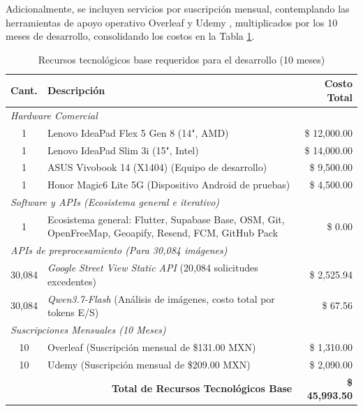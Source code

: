 Adicionalmente, se incluyen servicios por suscripción mensual, contemplando las herramientas de apoyo operativo Overleaf \cite{overleaf_pricing} y Udemy \cite{udemy_pricing}, multiplicados por los 10 meses de desarrollo, consolidando los costos en la Tabla \ref{tab:recursos_tecnologicos}.

\begin{table}[htbp]
    \centering
    \footnotesize
    \caption{Recursos tecnológicos base requeridos para el desarrollo (10 meses)}
    \label{tab:recursos_tecnologicos}
    \begin{tabular}{|c|p{}|r|}
        \hline
        \textbf{Cant.} & \textbf{Descripción} & \textbf{Costo Total} \\ \hline
        \multicolumn{3}{|l|}{\textit{Hardware Comercial}} \\ \hline
        1 & Lenovo IdeaPad Flex 5 Gen 8 (14", AMD) & \$ 12,000.00 \\ \hline
        1 & Lenovo IdeaPad Slim 3i (15", Intel) & \$ 14,000.00 \\ \hline
        1 & ASUS Vivobook 14 (X1404) (Equipo de desarrollo) & \$ 9,500.00 \\ \hline
        1 & Honor Magic6 Lite 5G (Dispositivo Android de pruebas) & \$ 4,500.00 \\ \hline
        \multicolumn{3}{|l|}{\textit{Software y APIs (Ecosistema general e iterativo)}} \\ \hline
        1 & Ecosistema general: Flutter, Supabase Base, OSM, Git, OpenFreeMap, Geoapify, Resend, FCM, GitHub Pack & \$ 0.00 \\ \hline
        \multicolumn{3}{|l|}{\textit{APIs de preprocesamiento (Para 30,084 imágenes)}} \\ \hline
        30,084 & \textit{Google Street View Static API} (20,084 solicitudes excedentes) & \$ 2,525.94 \\ \hline
        30,084 & \textit{Qwen3.7-Flash} (Análisis de imágenes, costo total por tokens E/S) & \$ 67.56 \\ \hline
        \multicolumn{3}{|l|}{\textit{Suscripciones Mensuales (10 Meses)}} \\ \hline
        10 & Overleaf (Suscripción mensual de \$131.00 MXN) & \$ 1,310.00 \\ \hline
        10 & Udemy (Suscripción mensual de \$209.00 MXN) & \$ 2,090.00 \\ \hline
        \multicolumn{2}{|r|}{\textbf{Total de Recursos Tecnológicos Base}} & \textbf{\$ 45,993.50} \\ \hline
    \end{tabular}
\end{table}

